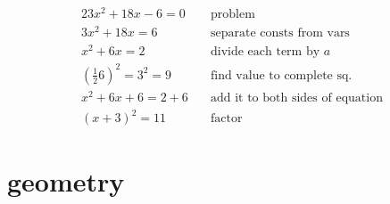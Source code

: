 \documentclass[a4paper,12pt]{article}
\begin{document}
\begin{alignat*}{2}
    3x^{2}+18x-6=0 &\quad \text{problem} \\
    3x^{2}+18x=6 &\quad \text{separate consts from vars} \\
    x^{2}+6x=2 &\quad \text{divide each term by } a \\
    \left(\frac{1}{2}6\right)^{2} = 3^{2} = 9 &\quad \text{find value to complete
    sq.} \\
    x^{2}+6x+6=2+6 &\quad \text{add it to both sides of equation} \\
    (x+3)^{2} = 11 &\quad \text{factor}
\end{alignat*}

\section{geometry}
\end{document}
